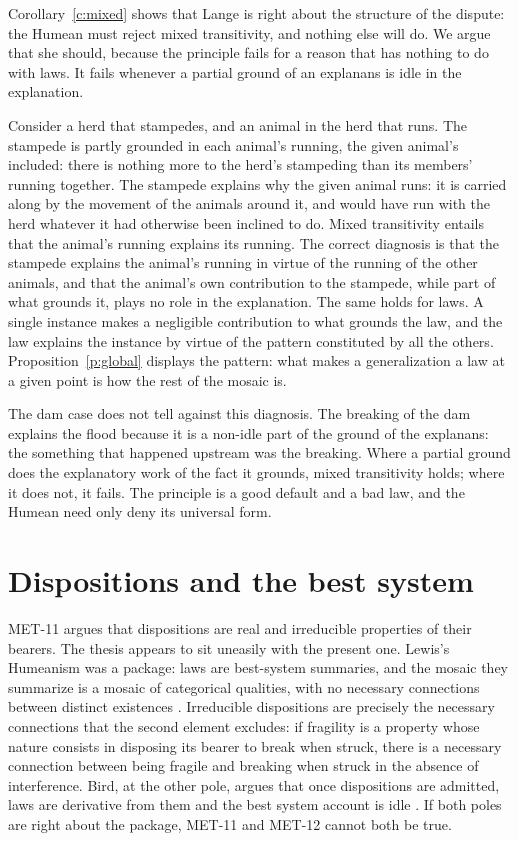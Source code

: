 \documentclass{situationist-preprint}
\begin{document}
Corollary~\ref{c:mixed} shows that Lange is right about the structure of the dispute: the Humean must reject mixed transitivity, and nothing else will do. We argue that she should, because the principle fails for a reason that has nothing to do with laws. It fails whenever a partial ground of an explanans is idle in the explanation.

Consider a herd that stampedes, and an animal in the herd that runs. The stampede is partly grounded in each animal's running, the given animal's included: there is nothing more to the herd's stampeding than its members' running together. The stampede explains why the given animal runs: it is carried along by the movement of the animals around it, and would have run with the herd whatever it had otherwise been inclined to do. Mixed transitivity entails that the animal's running explains its running. The correct diagnosis is that the stampede explains the animal's running in virtue of the running of the other animals, and that the animal's own contribution to the stampede, while part of what grounds it, plays no role in the explanation. The same holds for laws. A single instance makes a negligible contribution to what grounds the law, and the law explains the instance by virtue of the pattern constituted by all the others. Proposition~\ref{p:global} displays the pattern: what makes a generalization a law at a given point is how the rest of the mosaic is.

The dam case does not tell against this diagnosis. The breaking of the dam explains the flood because it is a non-idle part of the ground of the explanans: the something that happened upstream was the breaking. Where a partial ground does the explanatory work of the fact it grounds, mixed transitivity holds; where it does not, it fails. The principle is a good default and a bad law, and the Humean need only deny its universal form.

\section{Dispositions and the best system}\label{s:dispositions}

MET-11 argues that dispositions are real and irreducible properties of their bearers. The thesis appears to sit uneasily with the present one. Lewis's Humeanism was a package: laws are best-system summaries, and the mosaic they summarize is a mosaic of categorical qualities, with no necessary connections between distinct existences \citep[introduction]{Lewis1986Papers}. Irreducible dispositions are precisely the necessary connections that the second element excludes: if fragility is a property whose nature consists in disposing its bearer to break when struck, there is a necessary connection between being fragile and breaking when struck in the absence of interference. Bird, at the other pole, argues that once dispositions are admitted, laws are derivative from them and the best system account is idle \citep{Bird2007}. If both poles are right about the package, MET-11 and MET-12 cannot both be true.
\end{document}
